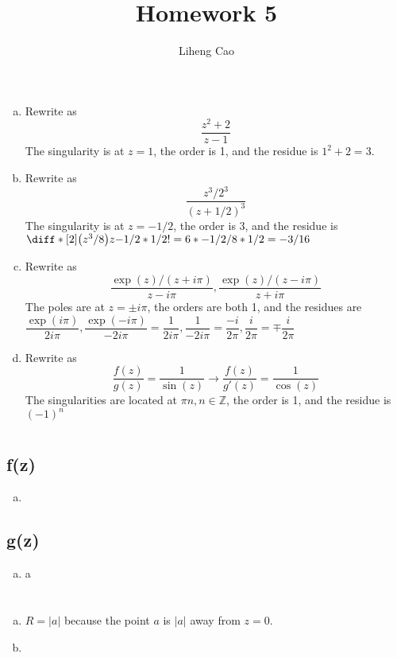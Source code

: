 \documentclass[12pt]{article}
\title{Homework 5}
\author{Liheng Cao}
\begin{document}
\maketitle

\section{}
\begin{enumerate}[(a)]
	\item Rewrite as \[ \dfrac{z^2+2}{z-1} \] The singularity is at $ z=1 $, the order is 1, and the residue is $ 1^2 + 2 = 3 $.
	
	\item Rewrite as \[ \dfrac{z^3/2^3}{(z+1/2)^3} \] The singularity is at $ z=-1/2 $, the order is 3, and the residue is $ \diff*[2]{\left(z^3/8\right)}{z}{-1/2} * 1/2! = 6*-1/2 / 8 * 1/2 = -3/16$
	
	\item Rewrite as \[ \dfrac{\exp{(z)}/(z+i\pi)}{z-i\pi}, \dfrac{\exp{(z)}/(z-i\pi)}{z+i\pi} \] The poles are at $ z = \pm i\pi $, the orders are both 1, and the residues are $ \dfrac{\exp{(i\pi)}}{2i\pi}, \dfrac{\exp{(-i\pi)}}{-2i\pi} = \dfrac{1}{2i\pi}, \dfrac{1}{-2i\pi} = \dfrac{-i}{2\pi}, \dfrac{i}{2\pi} = \mp \dfrac{i}{2\pi}$
	
	\item Rewrite as \[ \dfrac{f(z)}{g(z)} = \dfrac{1}{\sin{(z)}} \longrightarrow \dfrac{f(z)}{g'(z)} = \dfrac{1}{\cos{(z)}} \] The singularities are located at $ \pi n, n \in \mathbb{Z} $, the order is 1, and the residue is $ (-1)^n $
\end{enumerate}
\newpage

\section{}
\subsection{f(z)}
\begin{enumerate}[(a)]
	\item 
	
\end{enumerate}

\subsection{g(z)}
\begin{enumerate}[(a)]
	\item a
\end{enumerate}
\newpage

\section{}
\begin{enumerate}[(a)]
	\item $ R = |a| $ because the point $ a $ is $ |a| $ away from $ z=0 $.
	
	\item 
\end{enumerate}
\end{document}
